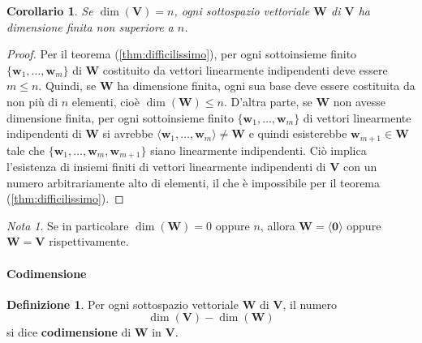 \documentclass{article}
\theoremstyle{plain}
\newtheorem{cor}{Corollario}
\theoremstyle{definition}
\newtheorem{defn}{Definizione}[section]
\theoremstyle{remark}
\newtheorem{note}{Nota}
\begin{document}
\vspace{10pt}

\begin{bxthm}
\begin{cor}
    Se \(\dim(\mathbf{V}) = n\), ogni sottospazio vettoriale \( \mathbf{W} \) di \( \mathbf{V} \) ha dimensione finita non superiore a \( n \).
\end{cor}
\end{bxthm}
\begin{proof}
    Per il teorema (\ref{thm:difficilissimo}), per ogni sottoinsieme finito \( \{\mathbf{w}_1, \ldots, \mathbf{w}_m\} \) di \( \mathbf{W} \) costituito da vettori linearmente indipendenti deve essere \( m \leq n \). 
    Quindi, se \( \mathbf{W} \) ha dimensione finita, ogni sua base deve essere costituita da non più di \( n \) elementi, cioè \(\dim(\mathbf{W}) \leq n\). 
    D'altra parte, se \( \mathbf{W} \) non avesse dimensione finita, per ogni sottoinsieme finito \( \{\mathbf{w}_1, \ldots, \mathbf{w}_m\} \) di vettori linearmente indipendenti di \( \mathbf{W} \) si avrebbe \( \langle\mathbf{w}_1, \ldots, \mathbf{w}_m\rangle\neq\mathbf{W} \) e quindi esisterebbe \( \mathbf{w}_{m+1} \in \mathbf{W} \) tale che \( \{\mathbf{w}_1, \ldots, \mathbf{w}_m, \mathbf{w}_{m+1}\} \) siano linearmente indipendenti.
    Ciò implica l'esistenza di insiemi finiti di vettori linearmente indipendenti di \( \mathbf{V} \) con un numero arbitrariamente alto di elementi, il che è impossibile per il teorema (\ref{thm:difficilissimo}).
\end{proof}

\vspace{10pt}

\begin{note}
    Se in particolare \(\dim(\mathbf{W}) = 0 \) oppure \(n\), allora \( \mathbf{W} = \langle\mathbf{0}\rangle\) oppure \(\mathbf{W} = \mathbf{V}\) rispettivamente.
\end{note}

\vspace{10pt}

\paragraph{Codimensione}
\begin{bxthm}
\begin{defn}
    Per ogni sottospazio vettoriale \(\mathbf{W}\) di \(\mathbf{V}\), il numero
    \[
        \dim(\mathbf{V}) - \dim(\mathbf{W})
    \]
    si dice \textbf{codimensione} di \(\mathbf{W}\) in \(\mathbf{V}\).    
\end{defn}
\end{bxthm}
\end{document}
